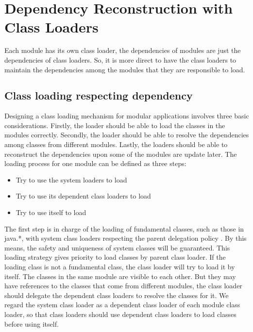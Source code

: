 \documentclass[conference]{IEEEtran}
\begin{document}
 
 
\section{Dependency Reconstruction with Class Loaders\label{sec:reconstructionCL}}

Each module has its own class loader, the dependencies of modules are just the dependencies of class loaders. 
So, it is more direct to have the class loaders to maintain the dependencies among the modules that they are responsible to load. 


\subsection{Class loading respecting dependency}

Designing a class loading mechanism for modular applications involves three basic considerations. Firstly, the loader should be able to load the classes in the modules correctly. Secondly, the loader should be able to resolve the dependencies among classes from different modules. Lastly, the loaders should be able to reconstruct the dependencies upon some of the modules are update later. 
The loading process for one module can be defined as three steps:
\begin{itemize}
\item Try to use the system loaders to load
\item Try to use its dependent class loaders to load
\item Try to use itself to load
\end{itemize}

The first step is in charge of the loading of fundamental classes, such as those in java.*, with system class loaders respecting the parent delegation policy \cite{parent_delegation}. By this means, the safety and uniqueness of system classes will be guaranteed. This loading strategy gives priority to load classes by parent class loader. If the loading class is not a fundamental class, the class loader will try to load it by itself. The classes in the same module are visible to each other. But they may have references to the classes that come from different modules, the class loader should delegate the dependent class loaders to resolve the classes for it. We regard the system class loader as a dependent class loader of each module class loader, so that class loaders should use dependent class loaders to load classes before using itself.
\end{document}
